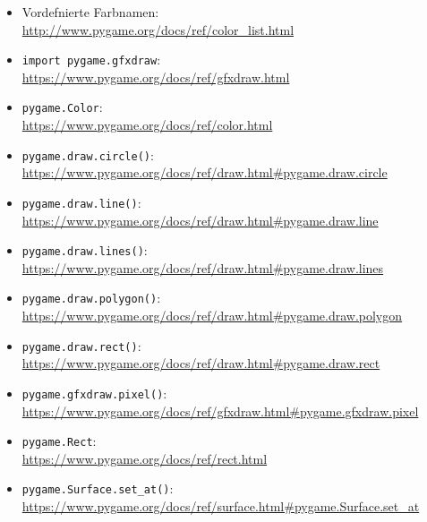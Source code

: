 \begin{itemize}
	\item Vordefnierte Farbnamen:\\ 
	\url{http://www.pygame.org/docs/ref/color_list.html}

	\item \texttt{import pygame.gfxdraw}:\\ \url{https://www.pygame.org/docs/ref/gfxdraw.html}
	
	\item \texttt{pygame.Color}:
	\\
	\url{https://www.pygame.org/docs/ref/color.html}
	
	\item \texttt{pygame.draw.circle()}:
	\\
	\url{https://www.pygame.org/docs/ref/draw.html#pygame.draw.circle}
	
	\item \texttt{pygame.draw.line()}:
	\\
	\url{https://www.pygame.org/docs/ref/draw.html#pygame.draw.line}
	
	\item \texttt{pygame.draw.lines()}:
	\\
	\url{https://www.pygame.org/docs/ref/draw.html#pygame.draw.lines}
	
	\item \texttt{pygame.draw.polygon()}:
	\\
	\url{https://www.pygame.org/docs/ref/draw.html#pygame.draw.polygon}
	
	\item \texttt{pygame.draw.rect()}:
	\\
	\url{https://www.pygame.org/docs/ref/draw.html#pygame.draw.rect}
	
	\item \texttt{pygame.gfxdraw.pixel()}:
    \\ \url{https://www.pygame.org/docs/ref/gfxdraw.html#pygame.gfxdraw.pixel}

	\item \texttt{pygame.Rect}:
	\\
	\url{https://www.pygame.org/docs/ref/rect.html}
	
	\item \texttt{pygame.Surface.set\_at()}:
	\\
	\url{https://www.pygame.org/docs/ref/surface.html#pygame.Surface.set_at}
	
\end{itemize}


